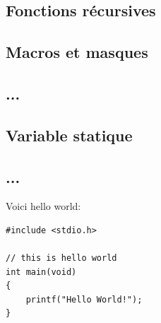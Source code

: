 \documentclass[a4paper]{article}
\begin{document}
\subsection{Fonctions récursives}








\subsection{Macros et masques}








\subsection{...}








\subsection{Variable statique}








\subsection{...}








Voici hello world:

\begin{lstlisting}[style=CStyle]
#include <stdio.h>

// this is hello world
int main(void)
{
    printf("Hello World!"); 
}
\end{lstlisting}
\end{document}
